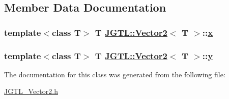 \subsection{Member Data Documentation}
\hypertarget{class_j_g_t_l_1_1_vector2_74fc6db01fb0803a14a786f0a798746e}{
\subsubsection[x]{\setlength{\rightskip}{0pt plus 5cm}template$<$class T$>$ T \hyperlink{class_j_g_t_l_1_1_vector2}{JGTL::Vector2}$<$ T $>$::\hyperlink{class_j_g_t_l_1_1_vector2_74fc6db01fb0803a14a786f0a798746e}{x}}}
\label{class_j_g_t_l_1_1_vector2_74fc6db01fb0803a14a786f0a798746e}


\hypertarget{class_j_g_t_l_1_1_vector2_f01a24f7cf968ea1c9f0721b7bb00cb4}{
\subsubsection[y]{\setlength{\rightskip}{0pt plus 5cm}template$<$class T$>$ T \hyperlink{class_j_g_t_l_1_1_vector2}{JGTL::Vector2}$<$ T $>$::\hyperlink{class_j_g_t_l_1_1_vector2_f01a24f7cf968ea1c9f0721b7bb00cb4}{y}}}
\label{class_j_g_t_l_1_1_vector2_f01a24f7cf968ea1c9f0721b7bb00cb4}




The documentation for this class was generated from the following file:\begin{CompactItemize}
\item 
\hyperlink{_j_g_t_l___vector2_8h}{JGTL\_\-Vector2.h}\end{CompactItemize}
